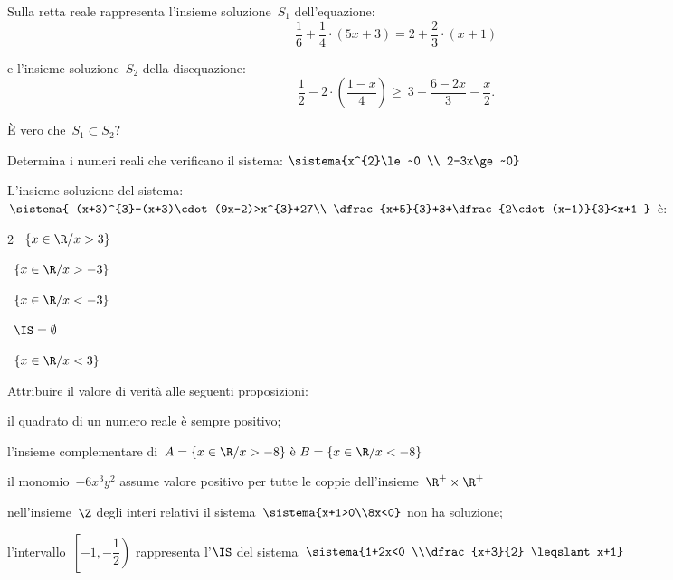 \begin{esercizio}
\label{ese:21.33}
Sulla retta reale rappresenta l'insieme soluzione~\(S_{1}\)
dell'equazione:
\[\dfrac{1}{6}+\dfrac{1}{4}\cdot (5x+3)=2+\dfrac{2}{3}\cdot (x+1)\]

e l'insieme soluzione~\(S_{2}\) della disequazione:
\[\dfrac{1}{2}-2\cdot\left(\dfrac{1-x}{4}\right)\ge~3-\dfrac{6-2x}{3}-\dfrac{x
}{2}.\]

È vero che~\(S_{1}\subset S_{2}\)?
\end{esercizio}

\begin{esercizio}[*]
\label{ese:21.34}
Determina i numeri reali che verificano il sistema:
\(\sistema{x^{2}\le~0 \\ 2-3x\ge~0}\)
\end{esercizio}

\begin{esercizio}
\label{ese:21.35}
L'insieme soluzione del sistema:
\(\sistema{
(x+3)^{3}-(x+3)\cdot (9x-2)>x^{3}+27\\
\dfrac{x+5}{3}+3+\dfrac{2\cdot (x-1)}{3}<x+1
}\) è:
\begin{htmulticols}{2}
\quad~\(\left\{x\in \R/x>3\right\}\)

\quad~\(\left\{x\in \R/x>-3\right\}\)

\quad~\(\left\{x\in \R/x<-3\right\}\)

\quad~\(\IS=\emptyset \)

\quad~\(\left\{x\in\R/x<3\right\}\)
\end{htmulticols}

\end{esercizio}

\begin{esercizio}
\label{ese:21.36}
Attribuire il valore di verità alle seguenti proposizioni:

\begin{enumeratea}
\item il quadrato di un numero reale è sempre positivo;
\item l'insieme complementare di~\(A=\{x\in\R/x>-8\}\text{ è 
}B=\{x\in\R/x<-8\}\)
\item il monomio~\(-6x^{3}y^{2}\) assume valore positivo per tutte le coppie 
dell'insieme~\(\R^{+}\times\R^{+}\)
\item nell'insieme~\(\Z\) degli interi relativi il 
sistema~\(\sistema{x+1>0\\8x<0}\) non ha 
soluzione;
\item l'intervallo~\(\left[-1,\left.-{\dfrac{1}{2}}\right)\right.\) 
rappresenta l'\(\IS\) del sistema~\(\sistema{1+2x<0 
\\\dfrac{x+3}{2} \leqslant x+1}\)
\end{enumeratea}
\end{esercizio}

